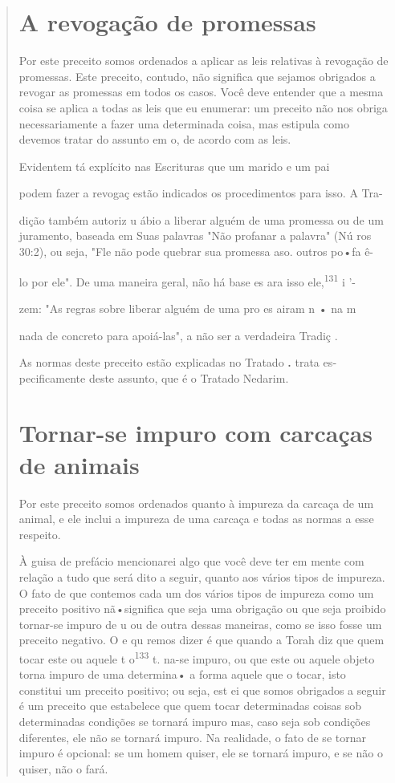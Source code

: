 \begin{quote}


\section{A revogação de promessas}

Por este preceito somos ordenados a aplicar as leis relativas à
revo­gação de promessas. Este preceito, contudo, não significa que
sejamos obriga­dos a revogar as promessas em todos os casos. Você deve
entender que a mes­ma coisa se aplica a todas as leis que eu enumerar:
um preceito não nos obriga necessariamente a fazer uma determinada
coisa, mas estipula como devemos tratar do assunto em o, de acordo com
as leis.

Evidentem tá explícito nas Escrituras que um marido e um pai

podem fazer a revogaç estão indicados os procedimentos para isso. A Tra-

dição também autoriz u ábio a liberar alguém de uma promessa ou de um\\
juramento, baseada em Suas palavras "Não profanar a palavra" (Nú ros\\
30:2), ou seja, "Fle não pode quebrar sua promessa aso. outros po•fa ê-

lo por ele". De uma maneira geral, não há base es ara isso
ele,\textsuperscript{131} i '-

zem: "As regras sobre liberar alguém de uma pro es airam n • na m

nada de concreto para apoiá-las", a não ser a verdadeira Tradiç .

As normas deste preceito estão explicadas no Tratado
\textbf{.} trata es­pecificamente deste assunto, que é
o Tratado Nedarim.

\section{Tornar-se impuro com carcaças de animais}

Por este preceito somos ordenados quanto à impureza da carcaça de um
animal, e ele inclui a impureza de uma carcaça e todas as normas a esse
respeito.

À guisa de prefácio mencionarei algo que você deve ter em mente com
relação a tudo que será dito a seguir, quanto aos vários tipos de
impureza. O fato de que contemos cada um dos vários tipos de impureza
como um pre­ceito positivo nã•significa que seja uma obrigação ou que
seja proibido tornar-se impuro de u ou de outra dessas maneiras, como se
isso fosse um preceito negativo. O e qu remos dizer é que quando a Torah
diz que quem tocar este ou aquele t o\textsuperscript{133} t. na-se
impuro, ou que este ou aquele objeto torna impuro de uma determina• a
forma aquele que o tocar, isto constitui um preceito posi­tivo; ou seja,
est ei que somos obrigados a seguir é um preceito que estabele­ce que
quem tocar determinadas coisas sob determinadas condições se tornará
impuro mas, caso seja sob condições diferentes, ele não se tornará
impuro. Na realidade, o fato de se tornar impuro é opcional: se um homem
quiser, ele se tornará impuro, e se não o quiser, não o fará.


\end{quote}
